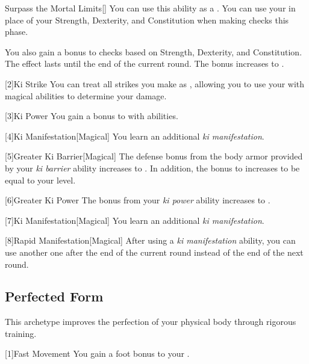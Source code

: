 {            \begin{freeability}{Surpass the Mortal Limits}[]
                You can use this ability as a .
                You can use your  in place of your Strength, Dexterity, and Constitution when making checks this phase.

                \rankline
                 You also gain a  bonus to checks based on Strength, Dexterity, and Constitution.
                 The effect lasts until the end of the current round.
                 The bonus increases to .
            \end{freeability}

        }

        [2]{Ki Strike} You can treat all strikes you make as , allowing you to use your  with magical abilities to determine your damage.

        [3]{Ki Power} You gain a  bonus to  with  abilities.

        [4]{Ki Manifestation}[Magical]
        You learn an additional \textit{ki manifestation}.

        [5]{Greater Ki Barrier}[Magical] The defense bonus from the body armor provided by your \textit{ki barrier} ability increases to .
        In addition, the bonus to  increases to be equal to your level.

        [6]{Greater Ki Power} The bonus from your \textit{ki power} ability increases to .

        [7]{Ki Manifestation}[Magical]
        You learn an additional \textit{ki manifestation}.

        [8]{Rapid Manifestation}[Magical] After using a \textit{ki manifestation} ability, you can use another one after the end of the current round instead of the end of the next round. 

    \subsection{Perfected Form}
        This archetype improves the perfection of your physical body through rigorous training.

        [1]{Fast Movement} You gain a  foot bonus to your .

